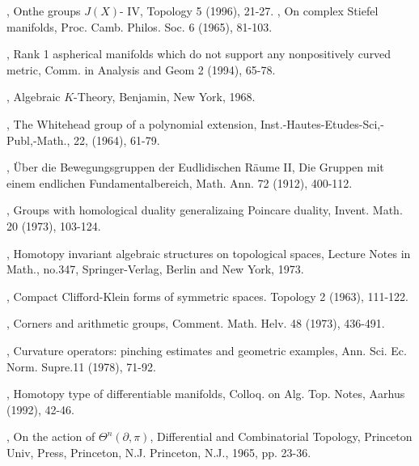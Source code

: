 

\begin{thebibliography}{99}
, On\pageoriginale the groups $J(X)$- IV, Topology 5 (1996),
  21-27.
, On complex Stiefel manifolds,
  Proc. Camb. Philos. Soc. 6 (1965), 81-103.

, Rank 1 aspherical manifolds
  which do not support any nonpositively curved metric, Comm. in
  Analysis and  Geom 2 (1994), 65-78.

, Algebraic $K$-Theory, Benjamin, New York, 1968.

, The Whitehead group of a
  polynomial extension, Inst.-Hautes-Etudes-Sci,-Publ,-Math., 22,
  (1964), 61-79.

, \"Uber die Bewegungsgruppen der
  Eudlidischen R\"aume II, Die Gruppen mit einem endlichen
  Fundamentalbereich, Math. Ann. 72 (1912), 400-112.

, Groups with homological duality
  generalizaing Poincare duality, Invent. Math. 20 (1973), 103-124.

, Homotopy invariant algebraic
  structures on topological spaces, Lecture Notes in Math., no.347,
  Springer-Verlag, Berlin and New York, 1973.

, Compact Clifford-Klein forms of symmetric
  spaces. Topology 2 (1963), 111-122.

, Corners and arithmetic groups,
  Comment. Math. Helv. 48 (1973), 436-491.

, Curvature operators:
  pinching estimates and geometric examples,
  Ann. Sci. Ec. Norm. Supre.11 (1978), 71-92.

, Homotopy type of differentiable manifolds,
  Colloq. on Alg. Top. Notes, Aarhus (1992), 42-46.

, On the action of $\Theta^n (\partial, \pi)$,
  Differential and Combinatorial Topology, Princeton Univ, Press,
  Princeton, N.J. Princeton, N.J., 1965, pp. 23-36.


\end{thebibliography}
